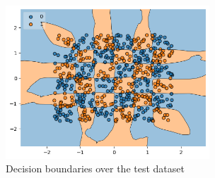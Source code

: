 \documentclass[compsoc]{IEEEtran}
\begin{document}
\begin{figure}[ht!]
\centering                                                                        
\includegraphics[width=3in]{../images/region.png}
\captionsetup{justification=centering}                                                                                                                                   
\caption{Decision boundaries over the test dataset}
\label{fig:regiontest}
\end{figure}
\end{document}
